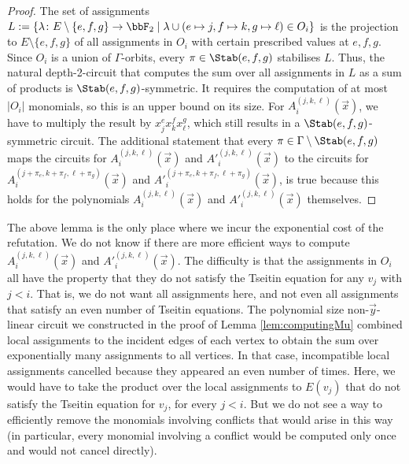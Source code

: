 \documentclass[a4paper,UKenglish,cleveref, autoref, thm-restate]{lipics-v2021}
\begin{document}
\begin{proof}
	The set of assignments $L := \{\lambda \colon E \setminus \{e,f,g\} \to \bbF_2 \mid \lambda \cup (e \mapsto j, f \mapsto k, g \mapsto \ell) \in O_i  \}$ is the projection to $E \setminus \{e,f,g\}$ of all assignments in $O_i$ with certain prescribed values at $e,f,g$.
	Since $O_i$ is a union of $\Gamma$-orbits, every $\pi \in \Stab(e,f,g)$ stabilises $L$. Thus, the natural depth-2-circuit that computes the sum over all assignments in $L$ as a sum of products is $\Stab(e,f,g)$-symmetric. It requires the computation of at most $|O_i|$ monomials, so this is an upper bound on its size.
	For $A^{(j,k,\ell)}_i(\vec x)$, we have to multiply the result by $x^{e}_jx^f_kx^g_\ell$, which still results in a $\Stab(e,f,g)$-symmetric circuit. The additional statement that  every $\pi \in \Gamma \setminus \Stab(e,f,g)$ maps the circuits for $A^{(j,k,\ell)}_i(\vec x)$ and $A'^{(j,k,\ell)}_i(\vec x)$ to the circuits for $A^{(j+\pi_e,k+\pi_f,\ell+\pi_g)}_i(\vec x)$ and $A'^{(j+\pi_e,k+\pi_f,\ell+\pi_g)}_i(\vec x)$, is true because this holds for the polynomials  $A^{(j,k,\ell)}_i(\vec x)$ and $A'^{(j,k,\ell)}_i(\vec x)$ themselves. 
\end{proof}	

The above lemma is the only place where we incur the exponential cost of the refutation. 
We do not know if there are more efficient ways to compute $A^{(j,k,\ell)}_i(\vec x)$ and $A'^{(j,k,\ell)}_i(\vec x)$. 
The difficulty is that the assignments in $O_i$ all have the property that they do not satisfy the Tseitin equation for any $v_j$ with $j < i$. That is, we do not want all assignments here, and not even all assignments that satisfy an even number of Tseitin equations. The polynomial size non-$\vec y$-linear circuit we constructed in the proof of Lemma \ref{lem:computingMu} combined local assignments to the incident edges of each vertex to obtain the sum over exponentially many assignments to all vertices. In that case, incompatible local assignments cancelled because they appeared an even number of times. Here, we would have to take the product over the local assignments to $E(v_j)$ that do not satisfy the Tseitin equation for $v_j$, for every $j < i$. But we do not see a way to efficiently remove the monomials involving conflicts that would arise in this way (in particular, every monomial involving a conflict would be computed only once and would not cancel directly).\\
\end{document}
